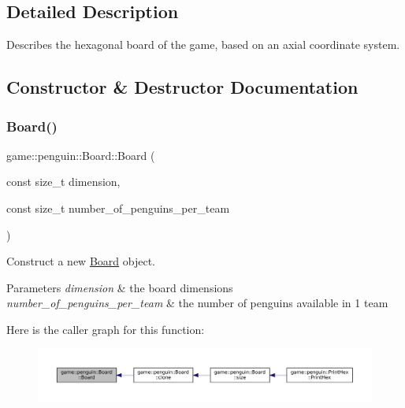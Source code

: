 \subsection{Detailed Description}
Describes the hexagonal board of the game, based on an axial coordinate system. 

\subsection{Constructor \& Destructor Documentation}
\mbox{\label{classgame_1_1penguin_1_1_board_aea5bd314dbc295e71759baf2051409c5}} 
\subsubsection{\texorpdfstring{Board()}{Board()}}
{\footnotesize\ttfamily game\+::penguin\+::\+Board\+::\+Board (\begin{DoxyParamCaption}\item[{const size\+\_\+t}]{dimension,  }\item[{const size\+\_\+t}]{number\+\_\+of\+\_\+penguins\+\_\+per\+\_\+team }\end{DoxyParamCaption})}



Construct a new \hyperlink{classgame_1_1penguin_1_1_board}{Board} object. 


\begin{DoxyParams}{Parameters}
{\em dimension} & the board dimensions \\
\hline
{\em number\+\_\+of\+\_\+penguins\+\_\+per\+\_\+team} & the number of penguins available in 1 team \\
\hline
\end{DoxyParams}
Here is the caller graph for this function\+:
\nopagebreak
\begin{figure}[H]
\begin{center}
\leavevmode
\includegraphics[width=350pt]{classgame_1_1penguin_1_1_board_aea5bd314dbc295e71759baf2051409c5_icgraph}
\end{center}
\end{figure}
\mbox{\label{classgame_1_1penguin_1_1_board_a7768c6b6dab42e72a3f3853af2ad1f5a}} 
